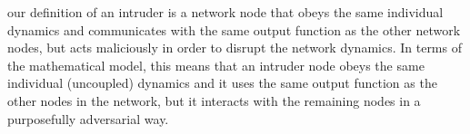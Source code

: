 \documentclass[%
 reprint,
 amsmath,amssymb,
 aip,
]{revtex4-2}
\theoremstyle{italichead}
\theoremstyle{definition}
\begin{document}
{%
our definition of an intruder is a network node that obeys the same individual dynamics  and communicates with the same output function as the other network nodes, but acts maliciously in order to disrupt the network dynamics.  In terms of the mathematical model, this means that an intruder node obeys the same individual (uncoupled) dynamics  and it uses the same output function as the other nodes in the network, but it interacts with the remaining nodes in a purposefully adversarial %
way. %

}
\end{document}
